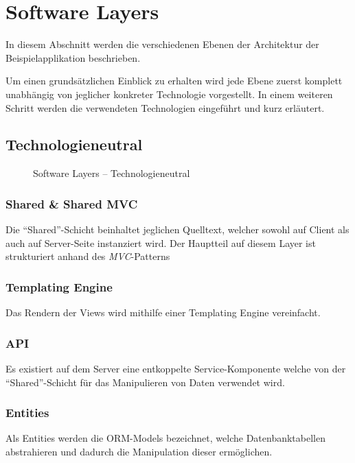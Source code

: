 \section{Software Layers}
\label{sec:sad-layers}

In diesem Abschnitt werden die verschiedenen Ebenen der Architektur der Beispielapplikation beschrieben.

Um einen grundsätzlichen Einblick zu erhalten wird jede Ebene zuerst komplett unabhängig von jeglicher konkreter Technologie vorgestellt. In einem weiteren Schritt werden die verwendeten Technologien eingeführt und kurz erläutert.


\subsection*{Technologieneutral}

\begin{figure}[H]
	\centering{
		
	}

	\caption{Software Layers -- Technologieneutral}
\end{figure}

\subsubsection*{Shared \& Shared MVC}
Die ``Shared''-Schicht beinhaltet jeglichen Quelltext, welcher sowohl auf Client als auch auf Server-Seite instanziert wird. Der Hauptteil auf diesem Layer ist strukturiert anhand des \emph{MVC}-Patterns

\subsubsection*{Templating Engine}
Das Rendern der Views wird mithilfe einer Templating Engine vereinfacht.

\subsubsection*{API}
Es existiert auf dem Server eine entkoppelte Service-Komponente welche von der ``Shared''-Schicht für das Manipulieren von Daten verwendet wird.

\subsubsection*{Entities}
Als Entities werden die \gls{ORM}-Models bezeichnet, welche Datenbanktabellen abstrahieren und dadurch die Manipulation dieser ermöglichen.

